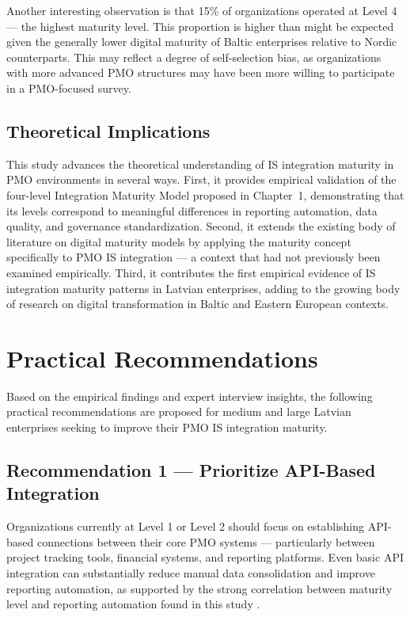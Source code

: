 Another interesting observation is that 15\% of organizations operated
at Level 4 --- the highest maturity level. This proportion is higher than
might be expected given the generally lower digital maturity of Baltic
enterprises relative to Nordic counterparts. This may reflect a degree
of self-selection bias, as organizations with more advanced PMO
structures may have been more willing to participate in a PMO-focused
survey.

\subsection{Theoretical Implications}
This study advances the theoretical understanding of IS integration
maturity in PMO environments in several ways. First, it provides
empirical validation of the four-level Integration Maturity Model
proposed in Chapter~1, demonstrating that its levels correspond to
meaningful differences in reporting automation, data quality, and
governance standardization. Second, it extends the existing body of
literature on digital maturity models by applying the maturity concept
specifically to PMO IS integration --- a context that had not previously
been examined empirically. Third, it contributes the first empirical
evidence of IS integration maturity patterns in Latvian enterprises,
adding to the growing body of research on digital transformation in
Baltic and Eastern European contexts.

\section{Practical Recommendations}
\label{sec:recommendations}

Based on the empirical findings and expert interview insights, the
following practical recommendations are proposed for medium and large
Latvian enterprises seeking to improve their PMO IS integration maturity.

\subsection{Recommendation 1 --- Prioritize API-Based Integration}
Organizations currently at Level 1 or Level 2 should focus on
establishing API-based connections between their core PMO systems ---
particularly between project tracking tools, financial systems, and
reporting platforms. Even basic API integration can substantially
reduce manual data consolidation and improve reporting automation,
as supported by the strong correlation between maturity level and
reporting automation found in this study \cite{hohpe2004}.

